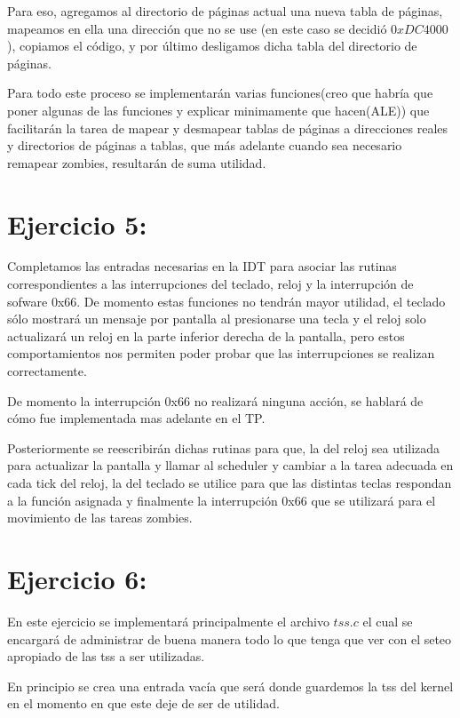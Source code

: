 \documentclass[a4paper]{article}
\begin{document}
Para eso, agregamos al directorio de páginas actual una nueva tabla de páginas, mapeamos en ella una dirección que no se use (en este caso se decidió $0xDC4000$), copiamos el código, y por último desligamos dicha tabla del directorio de páginas.

Para todo este proceso se implementarán varias funciones(creo que habría que poner algunas de las funciones y explicar minimamente que hacen(ALE)) que facilitarán la tarea de mapear y desmapear tablas de páginas a direcciones reales y directorios de páginas a tablas, que más adelante cuando sea necesario remapear zombies, resultarán de suma utilidad.

\section{Ejercicio 5:}
%

Completamos las entradas necesarias en la IDT para asociar las rutinas correspondientes a las interrupciones del teclado, reloj y la interrupción de sofware 0x66. De momento estas funciones no tendrán mayor utilidad, el teclado sólo mostrará un mensaje por pantalla al presionarse una tecla y el reloj solo actualizará un reloj en la parte inferior derecha de la pantalla, pero estos comportamientos nos permiten poder probar que las interrupciones se realizan correctamente.

De momento la interrupción 0x66 no realizará ninguna acción, se hablará de cómo fue implementada mas adelante en el TP.

Posteriormente se reescribirán dichas rutinas para que, la del reloj sea utilizada para actualizar la pantalla y llamar al scheduler y cambiar a la tarea adecuada en cada tick del reloj, la del teclado se utilice para que las distintas teclas respondan a la función asignada y finalmente la interrupción 0x66 que se utilizará para el movimiento de las tareas zombies.

\section{Ejercicio 6:}

En este ejercicio se implementará principalmente el archivo $tss.c$ el cual se encargará de administrar de buena manera todo lo que tenga que ver con el seteo apropiado de las tss a ser utilizadas.

En principio se crea una entrada vacía que será donde guardemos la tss del kernel en el momento en que este deje de ser de utilidad.
\end{document}
